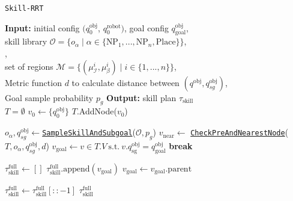 \begin{algorithm}[H]
\caption{\texttt{Skill-RRT}}\label{algo:skill-rrt}
\begin{algorithmic}[1]
\State \textbf{Input:} initial config $(q^{\text{obj}}_0$, $q^{\text{robot}}_0)$, goal config $q^{\text{obj}}_{\text{goal}}$, \\
skill library $\mathcal{O}=\{o_\alpha \mid \alpha \in \{\text{NP}_1, ..., \text{NP}_n, \text{Place}\}\}$, \\
\colorbox{gray!20}{}, \\
set of regions $\mathcal{M}=\{(\mu^i_{\mathcal{I}}, \mu^i_{\beta}) \mid i \in \{1, ..., n\}\}$, \\
Metric function $d$ to calculate distance between $(q^{\text{obj}}, q^{\text{obj}}_{sg})$, \\ Goal sample probability $p_g$
\State \textbf{Output:} skill plan $\tau_{\text{skill}}$ \\

\State $T=\emptyset$    
\State $v_{0} \gets \{ q^{\text{obj}}_{0} \}$ 
\State $T$.AddNode($v_{0}$)

    \State ${o_\alpha}, {q}^{\text{obj}}_{sg} \gets $\hyperref[algo:SampleSkillAndPose]{\texttt{SampleSkillAndSubgoal}}($\mathcal{O}, p_g$)
    \State ${v}_{\text{near}} \gets$ \hyperref[algo:NearestNode]{\texttt{CheckPreAndNearestNode}}($T, o_\alpha, q^{\text{obj}}_{sg}, d$)
\State \colorbox{gray!20}{}
        \State $v_{\text{goal}} \gets v \in T.V \ \text{s.t.} \ v.q^{\text{obj}}_{\text{sg}} = q^{\text{obj}}_{\text{goal}}$
        \State \textbf{break}
    \EndIf
\EndWhile

\State $\tau^\text{full}_{\text{skill}} \gets []$ 
    \State $\tau^\text{full}_{\text{skill}}.\text{append}(v_{\text{goal}})$
    \State $v_{\text{goal}} \gets v_{\text{goal}}.\text{parent}$
\EndWhile

\State $\tau^\text{full}_{\text{skill}} \gets \tau^\text{full}_{\text{skill}}[::-1]$ 
\State \Return $\tau^\text{full}_{\text{skill}}$

\end{algorithmic}
\end{algorithm}

